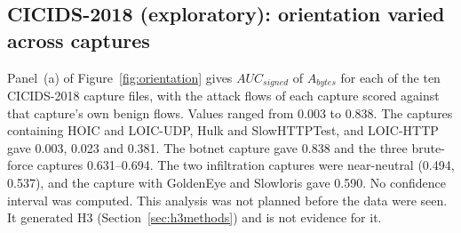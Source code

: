 \documentclass[preprint,12pt]{elsarticle}
\begin{document}
\begin{table}[H]
\caption{H2 on real CICIDS-2018 (DDoS LOIC-HTTP capture), 10\,s canonical windows, 378 attack / 890--913 benign windows: the five distinct conditions among the 7 levels that clear the gates. The frozen truncation levels 1/60 and 5/60 of the window give identical data (first second), 10/60 gives the first two seconds, and the frozen level 1 (unrestricted) equals 1:1 sampling; see the deviation described in the text.\label{tab:h2real}}
\centering
{}
\end{table}

\subsection{CICIDS-2018 (exploratory): orientation varied across captures}\label{sec:discovery}

Panel~(a) of Figure~\ref{fig:orientation} gives $AUC_{signed}$ of $A_{bytes}$ for each of the ten CICIDS-2018 capture files, with the attack flows of each capture scored against that capture's own benign flows. Values ranged from 0.003 to 0.838. The captures containing HOIC and LOIC-UDP, Hulk and SlowHTTPTest, and LOIC-HTTP gave 0.003, 0.023 and 0.381. The botnet capture gave 0.838 and the three brute-force captures 0.631--0.694. The two infiltration captures were near-neutral (0.494, 0.537), and the capture with GoldenEye and Slowloris gave 0.590. No confidence interval was computed. This analysis was not planned before the data were seen. It generated H3 (Section~\ref{sec:h3methods}) and is not evidence for it.
\end{document}
